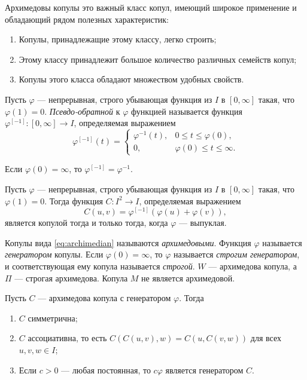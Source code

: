 Архимедовы копулы это важный класс копул, имеющий широкое применение и обладающий рядом полезных характеристик:
\begin{enumerate}
	\item Копулы, принадлежащие этому классу, легко строить;
	\item Этому классу принадлежит большое количество различных семейств копул;
	\item Копулы этого класса обладают множеством удобных свойств.
\end{enumerate}

\begin{define}
	Пусть $\varphi$ --- непрерывная, строго убывающая функция из $I$ в $[0, \infty]$ такая, что $\varphi(1) = 0$. \emph{Псевдо-обратной} к $\varphi$ функцией называется функция $\varphi^{[-1]} \colon [0, \infty] \to I$, определяемая выражением
\[
\varphi^{[-1]}(t) =
\begin{cases}
\varphi^{-1}(t) , &0 \leqslant t \leqslant \varphi(0), \\
0, &\varphi(0) \leqslant t \leqslant \infty.
\end{cases}
\]
\end{define}
Если $\varphi(0) = \infty$, то $\varphi^{[-1]} = \varphi^{-1}$.

\begin{theorem}
	Пусть $\varphi$ --- непрерывная, строго убывающая функция из $I$ в $[0, \infty]$ такая, что $\varphi(1) = 0$. Тогда функция $C \colon I^2 \to I$, определяемая выражением
	\begin{equation}\label{eq:archimedian}
		C(u, v) = \varphi^{[-1]}(\varphi(u) + \varphi(v)),
	\end{equation}
является копулой тогда и только тогда, когда $\varphi$ --- выпуклая.
\end{theorem}

Копулы вида \eqref{eq:archimedian} называются \emph{архимедовыми}. Функция $\varphi$ называется \emph{генератором} копулы. Если $\varphi(0) = \infty$, то $\varphi$ называется \emph{строгим генератором}, и соответствующая ему копула называется \emph{строгой}. $W$ --- архимедова копула, а $\Pi$ --- строгая архимедова. Копула $M$ не является архимедовой.

\begin{theorem}
	Пусть $C$ --- архимедова копула с генератором $\varphi$. Тогда
	\begin{enumerate}
	\item $C$ симметрична;
	\item $C$ ассоциативна, то есть $C(C(u, v), w) = C(u, C(v, w))$ для всех $u, v, w \in I$;
	\item Если $c > 0$ --- любая постоянная, то $c\varphi$ является генератором $C$.
	\end{enumerate}
\end{theorem}


